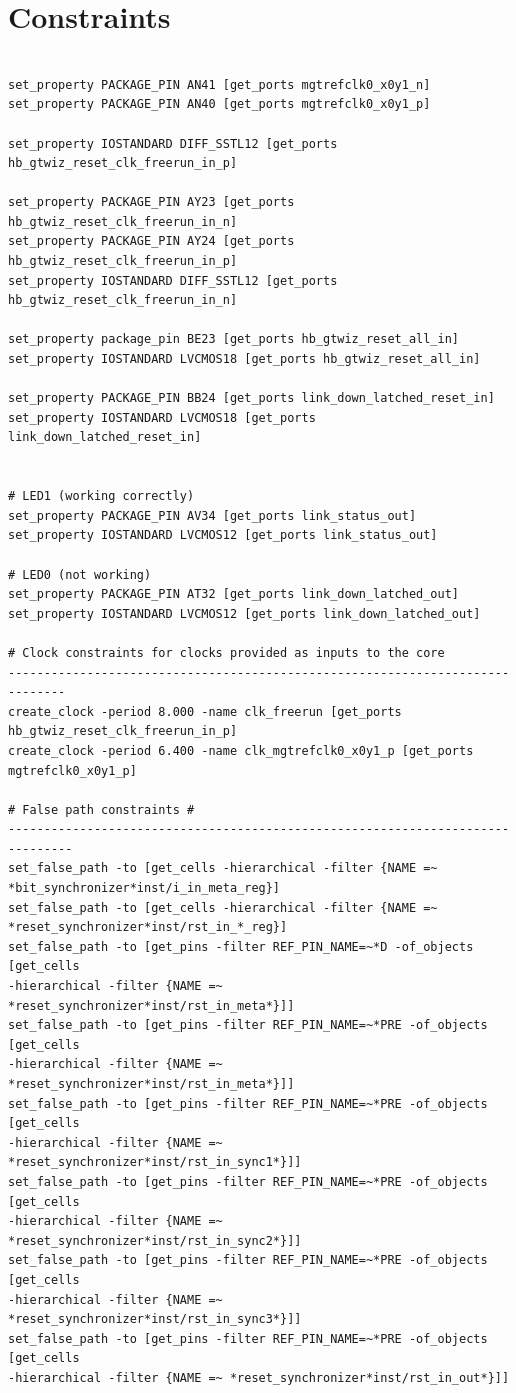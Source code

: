 \documentclass[oneside]{discothesis}
\begin{document}
\section{Constraints}%
\label{sec:constraints}
\begin{verbatim}

set_property PACKAGE_PIN AN41 [get_ports mgtrefclk0_x0y1_n] 
set_property PACKAGE_PIN AN40 [get_ports mgtrefclk0_x0y1_p]

set_property IOSTANDARD DIFF_SSTL12 [get_ports hb_gtwiz_reset_clk_freerun_in_p]

set_property PACKAGE_PIN AY23 [get_ports hb_gtwiz_reset_clk_freerun_in_n]
set_property PACKAGE_PIN AY24 [get_ports hb_gtwiz_reset_clk_freerun_in_p]
set_property IOSTANDARD DIFF_SSTL12 [get_ports hb_gtwiz_reset_clk_freerun_in_n]

set_property package_pin BE23 [get_ports hb_gtwiz_reset_all_in] 
set_property IOSTANDARD LVCMOS18 [get_ports hb_gtwiz_reset_all_in]

set_property PACKAGE_PIN BB24 [get_ports link_down_latched_reset_in]
set_property IOSTANDARD LVCMOS18 [get_ports link_down_latched_reset_in]


# LED1 (working correctly) 
set_property PACKAGE_PIN AV34 [get_ports link_status_out] 
set_property IOSTANDARD LVCMOS12 [get_ports link_status_out]

# LED0 (not working) 
set_property PACKAGE_PIN AT32 [get_ports link_down_latched_out] 
set_property IOSTANDARD LVCMOS12 [get_ports link_down_latched_out]

# Clock constraints for clocks provided as inputs to the core 
------------------------------------------------------------------------------
create_clock -period 8.000 -name clk_freerun [get_ports hb_gtwiz_reset_clk_freerun_in_p] 
create_clock -period 6.400 -name clk_mgtrefclk0_x0y1_p [get_ports mgtrefclk0_x0y1_p]

# False path constraints #
-------------------------------------------------------------------------------
set_false_path -to [get_cells -hierarchical -filter {NAME =~
*bit_synchronizer*inst/i_in_meta_reg}] 
set_false_path -to [get_cells -hierarchical -filter {NAME =~
*reset_synchronizer*inst/rst_in_*_reg}]
set_false_path -to [get_pins -filter REF_PIN_NAME=~*D -of_objects [get_cells
-hierarchical -filter {NAME =~ *reset_synchronizer*inst/rst_in_meta*}]]
set_false_path -to [get_pins -filter REF_PIN_NAME=~*PRE -of_objects [get_cells
-hierarchical -filter {NAME =~ *reset_synchronizer*inst/rst_in_meta*}]]
set_false_path -to [get_pins -filter REF_PIN_NAME=~*PRE -of_objects [get_cells
-hierarchical -filter {NAME =~ *reset_synchronizer*inst/rst_in_sync1*}]]
set_false_path -to [get_pins -filter REF_PIN_NAME=~*PRE -of_objects [get_cells
-hierarchical -filter {NAME =~ *reset_synchronizer*inst/rst_in_sync2*}]]
set_false_path -to [get_pins -filter REF_PIN_NAME=~*PRE -of_objects [get_cells
-hierarchical -filter {NAME =~ *reset_synchronizer*inst/rst_in_sync3*}]]
set_false_path -to [get_pins -filter REF_PIN_NAME=~*PRE -of_objects [get_cells
-hierarchical -filter {NAME =~ *reset_synchronizer*inst/rst_in_out*}]]



\end{verbatim}
\end{document}

